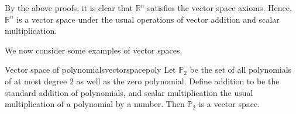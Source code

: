 \begin{solution}
By the above proofs, it is clear that $\mathbb{R}^n$ satisfies the vector space axioms. Hence, $\mathbb{R}^n$ is a vector space under the usual operations of vector addition and scalar multiplication. 
\end{solution}

We now consider some examples of vector spaces. 

\begin{example}{Vector space of polynomials}{vectorspacepoly}
Let $\mathbb{P}_2$ be the set of all polynomials of at most degree $2$ as well as the zero polynomial. Define addition to be the standard addition of polynomials, and scalar multiplication the usual multiplication of a polynomial by a number. Then $\mathbb{P}_2$ is a vector space. 
\end{example}


